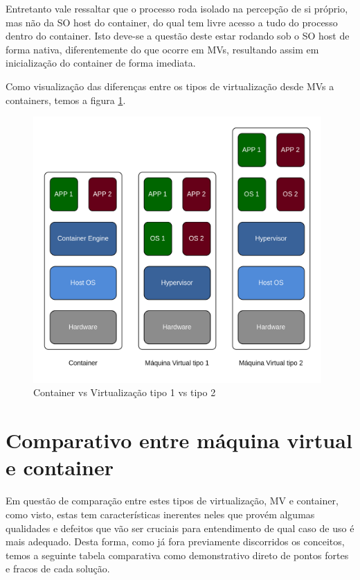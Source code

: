Entretanto vale ressaltar que o processo roda isolado na percepção de si próprio, mas não da SO host do container, do qual tem livre acesso a tudo do processo dentro do container. Isto deve-se a questão deste estar rodando sob o SO host de forma nativa, diferentemente do que ocorre em MVs, resultando assim em inicialização do container de forma imediata.

Como visualização das diferenças entre os tipos de virtualização desde MVs a containers, temos a figura \ref{fig:container_vs_virt_t1_vs_virt_t2}.

\begin{figure}
    \centering
    \includegraphics[width=11cm]{images/virt_container_vs_t1_vs_t2.drawio.png}
    \caption{Container vs Virtualização tipo 1 vs tipo 2}
    \label{fig:container_vs_virt_t1_vs_virt_t2}
\end{figure}

\section{Comparativo entre máquina virtual e container}
Em questão de comparação entre estes tipos de virtualização, MV e container, como visto, estas tem características inerentes neles que provém algumas qualidades e defeitos que vão ser cruciais para entendimento de qual caso de uso é mais adequado. Desta forma, como já fora previamente discorridos os conceitos, temos a seguinte tabela comparativa como demonstrativo direto de pontos fortes e fracos de cada solução.



